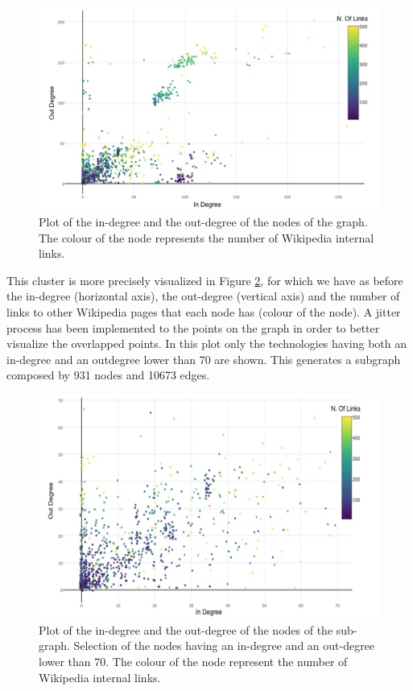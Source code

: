 \documentclass[]{book}
\begin{document}
\begin{figure}

{\centering \includegraphics[width=1\linewidth]{_bookdown_files/figures/techgraphplot1} 

}

\caption{Plot of the in-degree and the out-degree of the nodes of the graph. The colour of the node represents the number of Wikipedia internal links.}\label{fig:techgraphplot1}
\end{figure}

This cluster is more precisely visualized in Figure
\ref{fig:techgraphplot2}, for which we have as before the in-degree
(horizontal axis), the out-degree (vertical axis) and the number of
links to other Wikipedia pages that each node has (colour of the node).
A jitter process has been implemented to the points on the graph in
order to better visualize the overlapped points. In this plot only the
technologies having both an in-degree and an outdegree lower than 70 are
shown. This generates a subgraph composed by 931 nodes and 10673 edges.

\begin{figure}

{\centering \includegraphics[width=1\linewidth]{_bookdown_files/figures/techgraphplot2} 

}

\caption{Plot of the in-degree and the out-degree of the nodes of the sub-graph. Selection of the nodes having an in-degree and an out-degree lower than 70. The colour of the node represent the number of Wikipedia internal links.}\label{fig:techgraphplot2}
\end{figure}
\end{document}
